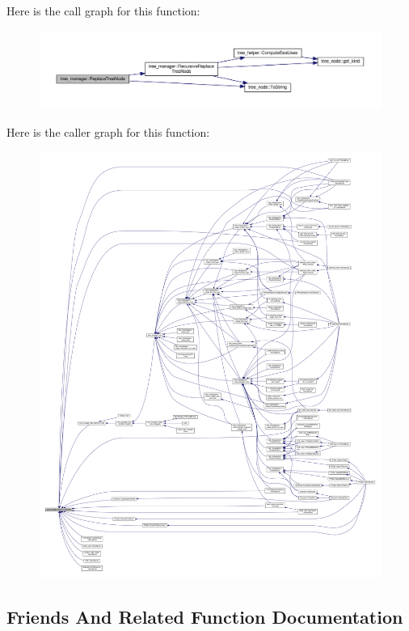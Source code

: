 Here is the call graph for this function\+:
\nopagebreak
\begin{figure}[H]
\begin{center}
\leavevmode
\includegraphics[width=350pt]{d2/ddd/classtree__manager_af0410e1ad992f9995223f187563e0289_cgraph}
\end{center}
\end{figure}
Here is the caller graph for this function\+:
\nopagebreak
\begin{figure}[H]
\begin{center}
\leavevmode
\includegraphics[width=350pt]{d2/ddd/classtree__manager_af0410e1ad992f9995223f187563e0289_icgraph}
\end{center}
\end{figure}


\subsection{Friends And Related Function Documentation}
\mbox{\label{classtree__manager_acf76c2fed025dbf61487c2b187bb9f99}} 
